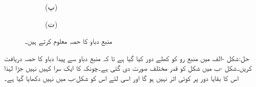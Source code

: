 \begin{figure}
\begin{subfigure}{0.5\textwidth}
\caption*{(پ)}
\end{subfigure}%
\begin{subfigure}{0.5\textwidth}
\centering
{}
\caption*{(ت)}
\end{subfigure}%
\caption{منبع دباو کا حصہ معلوم کرتے ہیں۔ }
\label{شکل_مسئلہ_مثال_منبع_دباو_حصہ}
\end{figure}

حل:شکل -الف میں منبع رو کو کھلے دور کیا گیا ہے تا کہ منبع دباو سے پیدا دباو کا حصہ دریافت کریں۔شکل -ب میں شکل کو قدر مختلف صورت دی گئی ہے۔چونکہ  کا ایک سرا کہیں نہیں جڑا لہٰذا اس کا بقایا دور پر کوئی اثر نہیں ہو گا اور اسی لئے اس کو شکل-ب میں نہیں دکھایا گیا ہے۔

